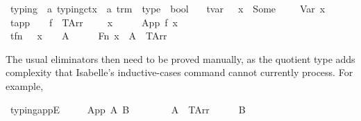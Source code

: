 \begin{implementation}
\isamarkupfalse%
\ typing\ {\isacharcolon}{\isacharcolon}\ {\isachardoublequoteopen}{\isacharprime}a\ typing{\isacharunderscore}ctx\ {\isasymRightarrow}\ {\isacharprime}a\ trm\ {\isasymRightarrow}\ type\ {\isasymRightarrow}\ bool{\isachardoublequoteclose}\  \isanewline
\ \ tvar{\isacharcolon}\ \ {\isachardoublequoteopen}{\isasymGamma}\ x\ {\isacharequal}\ Some\ {\isasymtau}\ {\isasymLongrightarrow}\ {\isasymGamma}\ {\isasymturnstile}\ Var\ x\ {\isacharcolon}\ {\isasymtau}{\isachardoublequoteclose}\isanewline
{\isacharbar}\ tapp{\isacharcolon}\ \ {\isachardoublequoteopen}{\isasymlbrakk}{\isasymGamma}\ {\isasymturnstile}\ f\ {\isacharcolon}\ {\isacharparenleft}TArr\ {\isasymtau}\ {\isasymsigma}{\isacharparenright}{\isacharsemicolon}\ {\isasymGamma}\ {\isasymturnstile}\ x\ {\isacharcolon}\ {\isasymtau}{\isasymrbrakk}\ {\isasymLongrightarrow}\ {\isasymGamma}\ {\isasymturnstile}\ App\ f\ x\ {\isacharcolon}\ {\isasymsigma}{\isachardoublequoteclose}\isanewline
{\isacharbar}\ tfn{\isacharcolon}\ \ \ {\isachardoublequoteopen}{\isasymGamma}{\isacharparenleft}x\ {\isasymmapsto}\ {\isasymtau}{\isacharparenright}\ {\isasymturnstile}\ A\ {\isacharcolon}\ {\isasymsigma}\ {\isasymLongrightarrow}\ {\isasymGamma}\ {\isasymturnstile}\ Fn\ x\ {\isasymtau}\ A\ {\isacharcolon}\ {\isacharparenleft}TArr\ {\isasymtau}\ {\isasymsigma}{\isacharparenright}{\isachardoublequoteclose}
\end{implementation}

The usual eliminators then need to be proved manually, as the quotient type adds complexity that Isabelle's inductive-cases command cannot currently process.
For example,

\begin{implementation}
\isamarkupfalse%
\ typing{\isacharunderscore}appE{\isacharcolon}\isanewline
\ \ \ {\isachardoublequoteopen}{\isasymGamma}\ {\isasymturnstile}\ App\ A\ B\ {\isacharcolon}\ {\isasymsigma}{\isachardoublequoteclose}\isanewline
\ \ \ {\isachardoublequoteopen}{\isasymexists}{\isasymtau}{\isachardot}\ {\isacharparenleft}{\isasymGamma}\ {\isasymturnstile}\ A\ {\isacharcolon}\ {\isacharparenleft}TArr\ {\isasymtau}\ {\isasymsigma}{\isacharparenright}{\isacharparenright}\ {\isasymand}\ {\isacharparenleft}{\isasymGamma}\ {\isasymturnstile}\ B\ {\isacharcolon}\ {\isasymtau}{\isacharparenright}{\isachardoublequoteclose}
\end{implementation}

